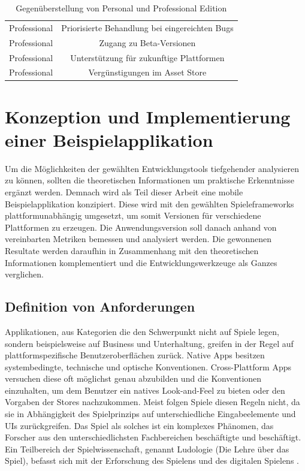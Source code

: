 \begin{table}[htbp]
{\begin{tabular}{cc}
			\rowcolor[HTML]{C0C0C0} 
			Professional                            & Priorisierte Behandlung bei eingereichten Bugs                                                                                        \\
			Professional                            & Zugang zu Beta-Versionen                                                                                                              \\
			\rowcolor[HTML]{C0C0C0} 
			Professional                            & Unterstützung für zukunftige Plattformen                                                                                              \\
			Professional                            & Vergünstigungen im Asset Store                                                                                                       
		\end{tabular}
	}
	\caption{Gegenüberstellung von Personal und Professional Edition}
	\label{Unity_Produkte}\citep{unity_products}
\end{table}


\chapter{Konzeption und Implementierung einer Beispielapplikation}
Um die Möglichkeiten der gewählten Entwicklungstools tiefgehender analysieren zu können, sollten die theoretischen Informationen um praktische Erkenntnisse ergänzt werden. Demnach wird als Teil dieser Arbeit eine mobile Beispielapplikation konzipiert. Diese wird mit den gewählten Spieleframeworks plattformunabhängig umgesetzt, um somit Versionen für verschiedene Plattformen zu erzeugen. Die Anwendungsversion soll danach anhand von vereinbarten Metriken bemessen und analysiert werden. Die gewonnenen Resultate werden daraufhin in Zusammenhang mit den theoretischen Informationen komplementiert und die Entwicklungswerkzeuge als Ganzes verglichen. 

\section{Definition von Anforderungen}
\label{sec:definition_anforderungen}
Applikationen, aus Kategorien die den Schwerpunkt nicht auf Spiele legen, sondern beispielsweise auf Business und Unterhaltung, greifen in der Regel auf plattformspezifische Benutzeroberflächen zurück. Native Apps besitzen systembedingte, technische und optische Konventionen. Cross-Plattform Apps versuchen diese oft möglichst genau abzubilden und die Konventionen einzuhalten, um dem Benutzer ein natives Look-and-Feel zu bieten oder den Vorgaben der Stores nachzukommen. 
Meist folgen Spiele diesen Regeln nicht, da sie in Abhängigkeit des Spielprinzips auf unterschiedliche Eingabeelemente und UIs zurückgreifen. 
Das Spiel als solches ist ein komplexes Phänomen, das Forscher aus den unterschiedlichsten Fachbereichen beschäftigte und beschäftigt. Ein Teilbereich der Spielwissenschaft, genannt Ludologie (Die Lehre über das Spiel), befasst sich mit der Erforschung des Spielens und des digitalen Spielens \citep{ludologie}. 

